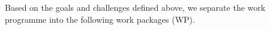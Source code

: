 \documentclass[enabledeprecatedfontcommands,cleardoublepage=empty,headsepline,twoside,11pt,DIV=15,BCOR=12mm,final]{scrartcl}
\begin{document}
 
 Based on the goals and challenges defined above, we separate the work programme into the following work packages (WP).
 
 
\end{document}

